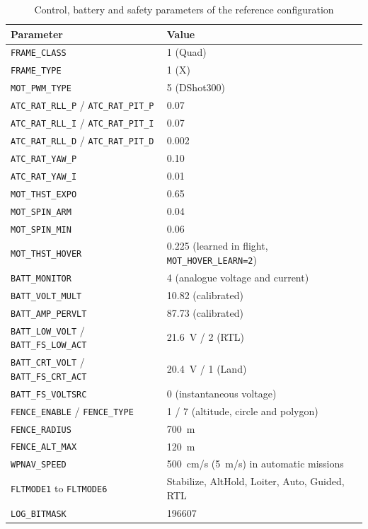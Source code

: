 \begin{table}[H]
    \centering
    \caption{Control, battery and safety parameters of the reference configuration}
    \label{tab:params-control}
    \small
    \begin{tabular}{ll}
        \toprule
        Parameter & Value \\
        \midrule
        \texttt{FRAME\_CLASS} & 1 (Quad) \\
        \texttt{FRAME\_TYPE} & 1 (X) \\
        \texttt{MOT\_PWM\_TYPE} & 5 (DShot300)~\cite{ardupilot_dshot} \\
        \texttt{ATC\_RAT\_RLL\_P} / \texttt{ATC\_RAT\_PIT\_P} & 0.07 \\
        \texttt{ATC\_RAT\_RLL\_I} / \texttt{ATC\_RAT\_PIT\_I} & 0.07 \\
        \texttt{ATC\_RAT\_RLL\_D} / \texttt{ATC\_RAT\_PIT\_D} & 0.002 \\
        \texttt{ATC\_RAT\_YAW\_P} & 0.10 \\
        \texttt{ATC\_RAT\_YAW\_I} & 0.01 \\
        \texttt{MOT\_THST\_EXPO} & 0.65 \\
        \texttt{MOT\_SPIN\_ARM} & 0.04 \\
        \texttt{MOT\_SPIN\_MIN} & 0.06 \\
        \texttt{MOT\_THST\_HOVER} & 0.225 (learned in flight, \texttt{MOT\_HOVER\_LEARN=2}) \\
        \texttt{BATT\_MONITOR} & 4 (analogue voltage and current) \\
        \texttt{BATT\_VOLT\_MULT} & 10.82 (calibrated) \\
        \texttt{BATT\_AMP\_PERVLT} & 87.73 (calibrated) \\
        \texttt{BATT\_LOW\_VOLT} / \texttt{BATT\_FS\_LOW\_ACT} & 21.6~V / 2 (RTL) \\
        \texttt{BATT\_CRT\_VOLT} / \texttt{BATT\_FS\_CRT\_ACT} & 20.4~V / 1 (Land) \\
        \texttt{BATT\_FS\_VOLTSRC} & 0 (instantaneous voltage) \\
        \texttt{FENCE\_ENABLE} / \texttt{FENCE\_TYPE} & 1 / 7 (altitude, circle and polygon) \\
        \texttt{FENCE\_RADIUS} & 700~m \\
        \texttt{FENCE\_ALT\_MAX} & 120~m \\
        \texttt{WPNAV\_SPEED} & 500~cm/s (5~m/s) in automatic missions \\
        \texttt{FLTMODE1} to \texttt{FLTMODE6} & Stabilize, AltHold, Loiter, Auto, Guided, RTL \\
        \texttt{LOG\_BITMASK} & 196607 \\
        \bottomrule
    \end{tabular}
\end{table}

